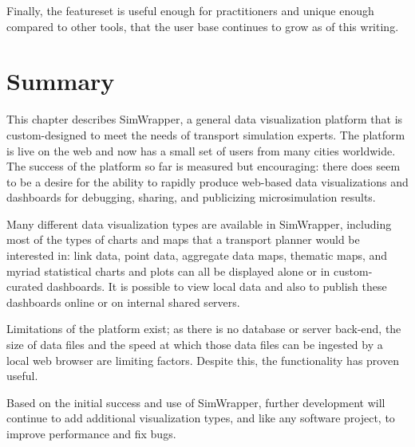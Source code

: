 Finally, the featureset is useful enough for practitioners and unique enough compared to other tools, that the user base continues to grow as of this writing.


\hypertarget{simwrapper-summary}{%
\section{Summary}\label{simwrapper-summary}}

This chapter describes SimWrapper, a general data visualization platform that is custom-designed to meet the needs of transport simulation experts. The platform is live on the web and now has a small set of users from many cities worldwide. The success of the platform so far is measured but encouraging: there does seem to be a desire for the ability to rapidly produce web-based data visualizations and dashboards for debugging, sharing, and publicizing microsimulation results.

Many different data visualization types are available in SimWrapper, including most of the types of charts and maps that a transport planner would be interested in: link data, point data, aggregate data maps, thematic maps, and myriad statistical charts and plots can all be displayed alone or in custom-curated dashboards. It is possible to view local data and also to publish these dashboards online or on internal shared servers.

Limitations of the platform exist; as there is no database or server back-end, the size of data files and the speed at which those data files can be ingested by a local web browser are limiting factors. Despite this, the functionality has proven useful.

Based on the initial success and use of SimWrapper, further development will continue to add additional visualization types, and like any software project, to improve performance and fix bugs.

